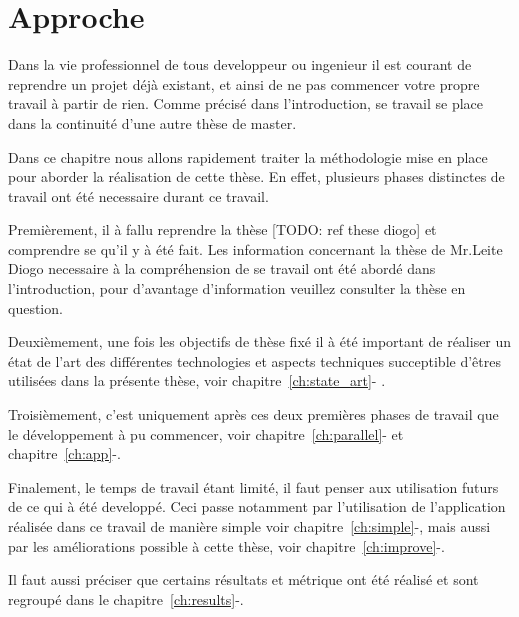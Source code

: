 \chapter{Approche}
\label{ch:approche}

Dans la vie professionnel de tous developpeur ou ingenieur il est courant de reprendre un projet déjà existant, et ainsi de ne pas commencer votre propre travail à partir de rien. Comme précisé dans l'introduction, se travail se place dans la continuité d'une autre thèse de master.

Dans ce chapitre nous allons rapidement traiter la méthodologie mise en place pour aborder la réalisation de cette thèse. En effet, plusieurs phases distinctes de travail ont été necessaire durant ce travail.

Premièrement, il à fallu reprendre la thèse [TODO: ref these diogo] et comprendre se qu'il y à été fait. Les information concernant la thèse de Mr.Leite Diogo necessaire à la compréhension de se travail ont été abordé dans l'introduction, pour d'avantage d'information veuillez consulter la thèse en question.

Deuxièmement, une fois les objectifs de thèse fixé il à été important de réaliser un état de l'art des différentes technologies et aspects techniques succeptible d'êtres utilisées dans la présente thèse, voir chapitre~\ref{ch:state_art}- .

Troisièmement, c'est uniquement après ces deux premières phases de travail que le développement à pu commencer, voir chapitre~\ref{ch:parallel}- et chapitre~\ref{ch:app}-.

Finalement, le temps de travail étant limité, il faut penser aux utilisation futurs de ce qui à été developpé. Ceci passe notamment par l'utilisation de l'application réalisée dans ce travail de manière simple voir chapitre~\ref{ch:simple}-, mais aussi par les améliorations possible à cette thèse, voir chapitre~\ref{ch:improve}-.

Il faut aussi préciser que certains résultats et métrique ont été réalisé et sont regroupé dans le chapitre~\ref{ch:results}-.

